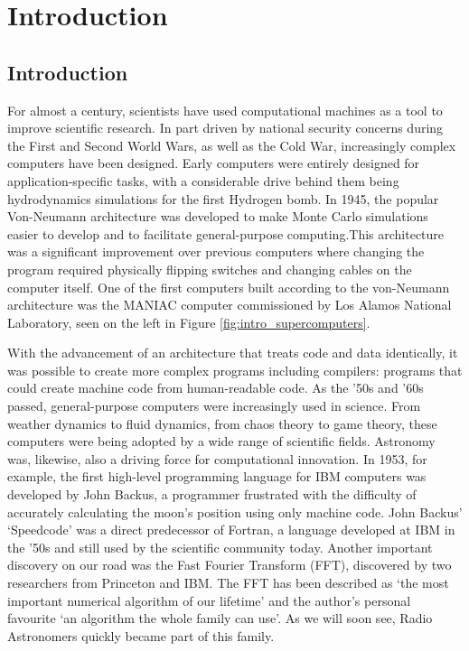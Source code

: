 \chapter{Introduction}

\section{Introduction}\label{sec:intro_intro}

For almost a century, scientists have used computational machines as a tool to improve scientific research. In part driven by national security concerns during the First and Second World Wars, as well as the Cold War, increasingly complex computers have been designed. Early computers were entirely designed for application-specific tasks, with a considerable drive behind them being hydrodynamics simulations for the first Hydrogen bomb. In 1945, the popular Von-Neumann\citep{Neumann:1945:FDR:1102046} architecture was developed to make Monte Carlo simulations easier to develop and to facilitate general-purpose computing.This architecture was a significant improvement over previous computers where changing the program required physically flipping switches and changing cables on the computer itself. One of the first computers built according to the von-Neumann architecture was the MANIAC\citep{wood1985early} computer commissioned by Los Alamos National Laboratory, seen on the left in Figure \ref{fig:intro_supercomputers}.

With the advancement of an architecture that treats code and data identically, it was possible to create more complex programs including compilers: programs that could create machine code from human-readable code. As the '50s and '60s passed, general-purpose computers were increasingly used in science. From weather dynamics\citep{lorenz1956empirical} to fluid dynamics\citep{harlow1965numerical}, from chaos theory to game theory, these computers were being adopted by a wide range of scientific fields. Astronomy was, likewise, also a driving force for computational innovation. In 1953, for example, the first high-level programming language for IBM computers was developed by John Backus, a programmer frustrated with the difficulty of accurately calculating the moon's position using only machine code. John Backus' `Speedcode' was a direct predecessor of Fortran\citep{allen1981history}, a language developed at IBM in the '50s and still used by the scientific community today. Another important discovery on our road was the Fast Fourier Transform (FFT), discovered by two researchers from Princeton and IBM\citep{bingham1967modern}. The FFT has been described as `the most important numerical algorithm of our lifetime' and the author's personal favourite `an algorithm the whole family can use'\citep{top_10_algos}. As we will soon see, Radio Astronomers quickly became part of this family.

